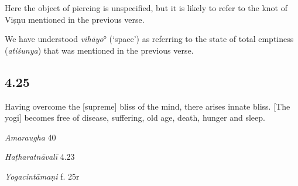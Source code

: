 \begin{ekdosis}
\begin{philcomm}[hp04_024]
Here the object of piercing is unspecified, but it is likely to refer to the knot of Viṣṇu mentioned in the previous verse.\lb

We have understood \emph{vihāyo}° (`space') as referring to the state of total emptiness (\emph{atiśunya}) that was mentioned in the previous verse. 

\end{philcomm}

\subsection*{4.25}
\begin{translation}[hp04_025]
Having overcome the [supreme] bliss of the mind, there arises innate bliss. [The yogi] becomes free of disease, suffering, old age, death, hunger and sleep.
\end{translation}

\begin{sources}[hp04_025]
\emph{Amaraugha} 40
\begin{versinnote}
\tl{\var{paramānanda° ] \emph{Amaraugha}; cittānandaṃ \emph{Amaraughaprabodha}.}\\+}
\tl{\var{°rocitvāt ] \emph{Amaraugha}; tato jitvā \emph{Amaraughaprabodha}}\\!}
\end{versinnote}
\end{sources}

\begin{testimonia}[hp04_025]
\emph{Haṭharatnāvalī} 4.23
\begin{versinnote}
\end{versinnote}

\emph{Yogacintāmaṇi} f. 25r
\begin{versinnote}
\end{versinnote}


\end{testimonia}
\end{ekdosis}
